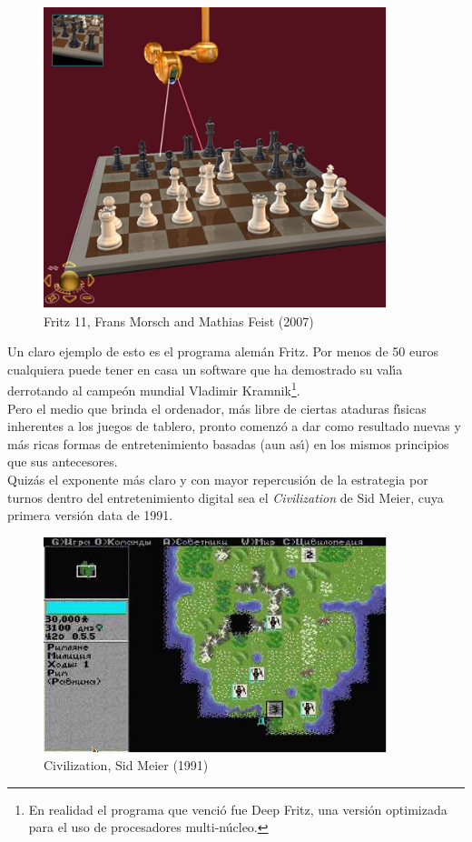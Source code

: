 \begin{figure}[h]
	\centering
		\includegraphics[width=10cm]{images/fritz11.png}
	\caption{Fritz 11, Frans Morsch and Mathias Feist (2007)}
	\label{fig:Imagen de Fritz 11}
\end{figure}
 
Un claro ejemplo de esto es el programa alem\'an Fritz. Por menos de 50 euros cualquiera puede tener en casa un software que ha demostrado su val\'{\i}a derrotando al campe\'on mundial Vladimir Kramnik\footnote{En realidad el programa que venci\'o fue Deep Fritz, una versi\'on optimizada para el uso de procesadores multi-n\'ucleo.}.\\

Pero el medio que brinda el ordenador, m\'as libre de ciertas ataduras f\'{\i}sicas inherentes a los juegos de tablero, pronto comenz\'o a dar como resultado nuevas y m\'as ricas formas de entretenimiento basadas (aun as\'{\i}) en los mismos principios que sus antecesores.\\

Quiz\'as el exponente m\'as claro y con mayor repercusi\'on de la estrategia por turnos dentro del entretenimiento digital sea el \emph{Civilization} de Sid Meier, cuya primera versi\'on data de 1991.\\

\begin{figure}
	\centering
		\includegraphics[width=10cm]{images/civilization.png}
	\caption{Civilization, Sid Meier (1991)}
	\label{fig:Imagen de la primera versi\'on para DOS del Civilization}
\end{figure}	
	
